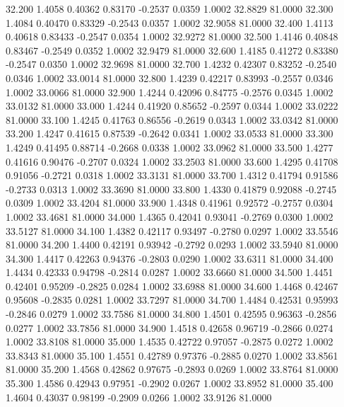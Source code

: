   32.200   1.4058   0.40362   0.83170  -0.2537   0.0359   1.0002  32.8829  81.0000
  32.300   1.4084   0.40470   0.83329  -0.2543   0.0357   1.0002  32.9058  81.0000
  32.400   1.4113   0.40618   0.83433  -0.2547   0.0354   1.0002  32.9272  81.0000
  32.500   1.4146   0.40848   0.83467  -0.2549   0.0352   1.0002  32.9479  81.0000
  32.600   1.4185   0.41272   0.83380  -0.2547   0.0350   1.0002  32.9698  81.0000
  32.700   1.4232   0.42307   0.83252  -0.2540   0.0346   1.0002  33.0014  81.0000
  32.800   1.4239   0.42217   0.83993  -0.2557   0.0346   1.0002  33.0066  81.0000
  32.900   1.4244   0.42096   0.84775  -0.2576   0.0345   1.0002  33.0132  81.0000
  33.000   1.4244   0.41920   0.85652  -0.2597   0.0344   1.0002  33.0222  81.0000
  33.100   1.4245   0.41763   0.86556  -0.2619   0.0343   1.0002  33.0342  81.0000
  33.200   1.4247   0.41615   0.87539  -0.2642   0.0341   1.0002  33.0533  81.0000
  33.300   1.4249   0.41495   0.88714  -0.2668   0.0338   1.0002  33.0962  81.0000
  33.500   1.4277   0.41616   0.90476  -0.2707   0.0324   1.0002  33.2503  81.0000
  33.600   1.4295   0.41708   0.91056  -0.2721   0.0318   1.0002  33.3131  81.0000
  33.700   1.4312   0.41794   0.91586  -0.2733   0.0313   1.0002  33.3690  81.0000
  33.800   1.4330   0.41879   0.92088  -0.2745   0.0309   1.0002  33.4204  81.0000
  33.900   1.4348   0.41961   0.92572  -0.2757   0.0304   1.0002  33.4681  81.0000
  34.000   1.4365   0.42041   0.93041  -0.2769   0.0300   1.0002  33.5127  81.0000
  34.100   1.4382   0.42117   0.93497  -0.2780   0.0297   1.0002  33.5546  81.0000
  34.200   1.4400   0.42191   0.93942  -0.2792   0.0293   1.0002  33.5940  81.0000
  34.300   1.4417   0.42263   0.94376  -0.2803   0.0290   1.0002  33.6311  81.0000
  34.400   1.4434   0.42333   0.94798  -0.2814   0.0287   1.0002  33.6660  81.0000
  34.500   1.4451   0.42401   0.95209  -0.2825   0.0284   1.0002  33.6988  81.0000
  34.600   1.4468   0.42467   0.95608  -0.2835   0.0281   1.0002  33.7297  81.0000
  34.700   1.4484   0.42531   0.95993  -0.2846   0.0279   1.0002  33.7586  81.0000
  34.800   1.4501   0.42595   0.96363  -0.2856   0.0277   1.0002  33.7856  81.0000
  34.900   1.4518   0.42658   0.96719  -0.2866   0.0274   1.0002  33.8108  81.0000
  35.000   1.4535   0.42722   0.97057  -0.2875   0.0272   1.0002  33.8343  81.0000
  35.100   1.4551   0.42789   0.97376  -0.2885   0.0270   1.0002  33.8561  81.0000
  35.200   1.4568   0.42862   0.97675  -0.2893   0.0269   1.0002  33.8764  81.0000
  35.300   1.4586   0.42943   0.97951  -0.2902   0.0267   1.0002  33.8952  81.0000
  35.400   1.4604   0.43037   0.98199  -0.2909   0.0266   1.0002  33.9126  81.0000
